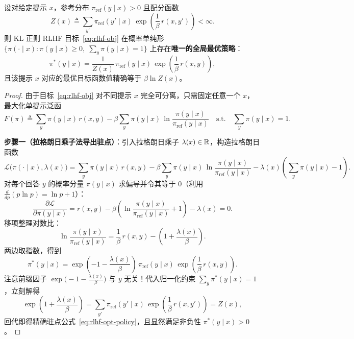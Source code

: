 \begin{thmBox}
\begin{theorem}
\label{thm:rlhf-optimal}
设对给定提示 $x$，参考分布 $\pi_{\mathrm{ref}}(y \mid x) > 0$ 且配分函数
\begin{equation}
  Z(x) \triangleq \sum_{y'} \pi_{\mathrm{ref}}(y' \mid x)\,\exp\!\left(\frac{1}{\beta}\,r(x, y')\right) < \infty.
  \label{eq:rlhf-partition}
\end{equation}
则 KL 正则 RLHF 目标~\eqref{eq:rlhf-obj} 在概率单纯形 $\{\pi(\cdot \mid x) : \pi(y\mid x) \ge 0,\; \sum_y \pi(y\mid x) = 1\}$ 上存在\textbf{唯一的全局最优策略}：
\begin{equation}
  \pi^*(y \mid x) = \frac{1}{Z(x)}\,\pi_{\mathrm{ref}}(y \mid x)\,\exp\!\left(\frac{1}{\beta}\,r(x, y)\right),
  \label{eq:rlhf-opt-policy}
\end{equation}
且该提示 $x$ 对应的最优目标函数值精确等于 $\beta \ln Z(x)$。
\end{theorem}
\begin{proof}
由于目标~\eqref{eq:rlhf-obj} 对不同提示 $x$ 完全可分离，只需固定任意一个 $x$，最大化单提示泛函
\[
  F(\pi) \triangleq \sum_y \pi(y \mid x)\, r(x, y) - \beta \sum_y \pi(y \mid x)\,\ln\frac{\pi(y \mid x)}{\pi_{\mathrm{ref}}(y \mid x)}
  \quad \text{s.t.} \quad \sum_y \pi(y \mid x) = 1.
\]

\textbf{步骤一（拉格朗日乘子法导出驻点）}：引入拉格朗日乘子 $\lambda(x) \in \mathbb{R}$，构造拉格朗日函数
\[
  \mathcal{L}\big(\pi(\cdot \mid x), \lambda(x)\big)
  = \sum_y \pi(y \mid x)\, r(x, y)
    - \beta \sum_y \pi(y \mid x)\,\ln\frac{\pi(y \mid x)}{\pi_{\mathrm{ref}}(y \mid x)}
    - \lambda(x)\!\left(\sum_y \pi(y \mid x) - 1\right).
\]
对每个回答 $y$ 的概率分量 $\pi(y \mid x)$ 求偏导并令其等于 $0$（利用 $\frac{d}{dp}(p\ln p) = \ln p + 1$）：
\[
  \frac{\partial \mathcal{L}}{\partial \pi(y \mid x)}
  = r(x, y) - \beta\!\left(\ln\frac{\pi(y \mid x)}{\pi_{\mathrm{ref}}(y \mid x)} + 1\right) - \lambda(x) = 0.
\]
移项整理对数比：
\[
  \ln\frac{\pi(y \mid x)}{\pi_{\mathrm{ref}}(y \mid x)}
  = \frac{1}{\beta}\,r(x, y) - \left(1 + \frac{\lambda(x)}{\beta}\right).
\]
两边取指数，得到
\[
  \pi^*(y \mid x)
  = \exp\!\left(-1 - \frac{\lambda(x)}{\beta}\right)\,\pi_{\mathrm{ref}}(y \mid x)\,\exp\!\left(\frac{1}{\beta}\,r(x, y)\right).
\]
注意前缀因子 $\exp\!\big(-1 - \frac{\lambda(x)}{\beta}\big)$ 与 $y$ 无关！代入归一化约束 $\sum_y \pi^*(y \mid x) = 1$，立刻解得
\[
  \exp\!\left(1 + \frac{\lambda(x)}{\beta}\right)
  = \sum_{y'} \pi_{\mathrm{ref}}(y' \mid x)\,\exp\!\left(\frac{1}{\beta}\,r(x, y')\right)
  = Z(x),
\]
回代即得精确驻点公式~\eqref{eq:rlhf-opt-policy}，且显然满足非负性 $\pi^*(y\mid x) > 0$。


\end{proof}
\end{thmBox}
